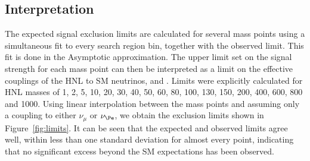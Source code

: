 \subsection{Interpretation}
 The expected signal exclusion limits are calculated for
 several mass points using a simultaneous fit to every search region
 bin, together with the observed limit. This fit is done in the
 Asymptotic approximation. The upper limit set on the signal strength
 for each mass point can then be interpreted as a
 limit on the effective couplings of the HNL to SM neutrinos, \mixpare
 and \mixparm. Limits were explicitly calculated for HNL masses of 1, 2, 5, 10, 20, 30, 40, 50, 60, 80, 100,
 130, 150, 200, 400, 600, 800 and 1000\GeV. Using linear
 interpolation between the mass points and assuming only a coupling to either $\nu_{\mu}$ or $\nu_{\Pe}$,
 we obtain the exclusion limits shown in Figure~\ref{fig:limits}. It can be seen that the expected and
 observed limits agree well, within less than one standard deviation
 for almost every point, indicating that no significant excess beyond
 the SM expectations has been observed. 

